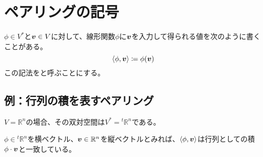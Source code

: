 \documentclass[../../../topic_linear-algebra]{subfiles}
\begin{document}
\sectionline
\section{ペアリングの記号}

\begin{mindflow}
\end{mindflow}

$\phi \in V^*$と$\vb*{v} \in V$に対して、線形関数$\phi$に$\vb*{v}$を入力して得られる値を次のように書くことがある。
\begin{equation*}
  \langle \phi, \vb*{v} \rangle \coloneq \phi(\vb*{v})
\end{equation*}
この記法をと呼ぶことにする。

\subsection{例：行列の積を表すペアリング}

$V = \mathbb{R}^n$の場合、その双対空間は$V^* = {}^t\mathbb{R}^n$である。

\br

$\phi \in {}^t\mathbb{R}^n$を横ベクトル、$\vb*{v} \in \mathbb{R}^n$を縦ベクトルとみれば、$\langle \phi, \vb*{v} \rangle$は行列としての積$\phi \cdot \vb*{v}$と一致している。
\end{document}

